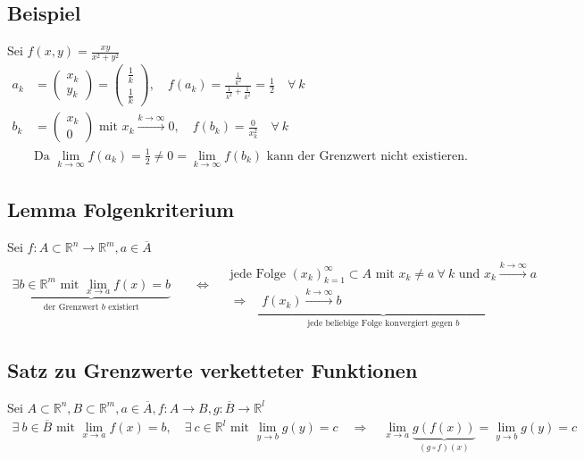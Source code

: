 \documentclass[11pt,a4paper]{book}
\newcommand {\R}	{\mathbb{R}}
\newcommand {\Rn}	{\mathbb{R}^n}
\newcommand {\Rm}	{\mathbb{R}^m}
\newcommand{\1}    	{\mathbbm{1}}
\newcommand{\mitt}	{\textrm{ mit }}
\begin{document}
\subsection{Beispiel}
Sei \( f(x,y) = \frac{xy}{x^2 + y^2} \)
\begin{align*}
	a_k &= \left( \begin{array}{c} x_k \\ y_k \end{array} \right) = \left( \begin{array}{c} \frac{1}{k} \\ \frac{1}{k} \end{array} \right), \quad 
	f(a_k) = \frac{\frac{1}{k^2}}{\frac{1}{k^2} + \frac{1}{k^2}} = \frac{1}{2} \quad \forall~ k \\
	b_k &= \left( \begin{array}{c} x_k \\ 0 \end{array} \right) \mitt x_k \stackrel{k \rightarrow \infty}{\rightarrow} 0, \quad
	f(b_k) = \frac{0}{x_k^2} \quad \forall~ k \\
	&\textrm{Da } \lim_{k \rightarrow \infty} f(a_k) = \frac{1}{2} \neq 0 = \lim_{k \rightarrow \infty} f(b_k) \textrm{ kann der Grenzwert nicht existieren.}
\end{align*}

\subsection{Lemma Folgenkriterium}
Sei \(f : A \subset \Rn \rightarrow \Rm, a \in \overline{A} \)
\begin{align*}
	\underbrace{\exists b \in \Rm \mitt \lim_{x \rightarrow a} f(x) = b}_{\textrm{der Grenzwert } b \textrm{ existiert}} \quad &\Leftrightarrow \quad
	\underbrace{
		\begin{array}{l}
			\textrm{jede Folge } (x_k)_{k=1}^\infty \subset A \mitt x_k \neq a ~ \forall~ k \textrm{ und } x_k \stackrel{k \rightarrow \infty}{\rightarrow} a \\
			\Rightarrow  \quad f(x_k) \stackrel{k \rightarrow \infty}{\rightarrow} b
		\end{array}
	}_{\textrm{jede beliebige Folge konvergiert gegen } b}
\end{align*}

\subsection{Satz zu Grenzwerte verketteter Funktionen}
Sei \(A \subset \Rn, B \subset \Rm, a \in \overline{A}, f: A \rightarrow B, g: \overline{B} \rightarrow \R^l \)
\begin{align*}
	\exists~ b \in \overline{B} \mitt \lim_{x \rightarrow a} f(x) = b, \quad
	\exists~ c \in \R^l \mitt \lim_{y \rightarrow b} g(y) = c \quad \Rightarrow \quad
	\lim_{x \rightarrow a} \underbrace{g\left(f(x)\right)}_{(g \circ f)(x)} = \lim_{y \rightarrow b} g(y) = c
\end{align*}
\end{document}
